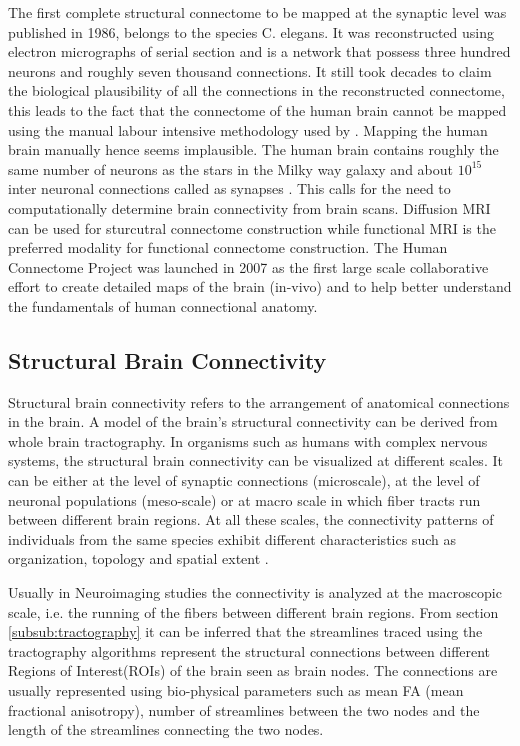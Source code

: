 \documentclass[msthesis.tex]{subfiles}
\begin{document}
The first complete structural connectome to be mapped at the synaptic level was published in 1986,  belongs to the species C. elegans. It was reconstructed using electron micrographs of serial section and is a network that possess three hundred neurons and roughly seven thousand connections. It still took decades to claim the biological plausibility of all the connections in the reconstructed connectome\cite{elegans}, this leads to the fact that the connectome of the human brain cannot be mapped using the manual labour intensive methodology used by \cite{white1986structure}. Mapping the human brain manually hence seems implausible. The human brain contains roughly the same number of neurons as the stars in the Milky way galaxy and about $10^{15}$ inter neuronal connections called as synapses \citep{fornito2015connectomics}. This calls for the need to computationally determine brain connectivity from brain scans. Diffusion MRI can be used for sturcutral connectome construction while functional MRI is the preferred modality for functional connectome construction. The Human Connectome Project was launched in 2007 as the first large scale collaborative effort to create detailed maps of the brain (in-vivo) and to help better understand the fundamentals of human connectional anatomy.

\subsection{Structural Brain Connectivity}
Structural brain connectivity refers to the arrangement of anatomical connections in the brain. A model of the brain's structural connectivity can be derived from whole brain tractography. In organisms such as humans with complex nervous systems, the structural brain connectivity can be visualized at different scales. It can be either at the level of synaptic connections (microscale), at the level of neuronal populations (meso-scale) or at macro scale in which fiber tracts run between different brain regions. At all these scales, the connectivity patterns of individuals from the same species exhibit different characteristics such as organization, topology and spatial extent \citep{Sporns:2007}.

Usually in Neuroimaging studies the connectivity is analyzed at the macroscopic scale, i.e. the running of the fibers between different brain regions.  From section \autoref{subsub:tractography} it can be inferred that the streamlines traced using the tractography algorithms represent the structural connections between different Regions of Interest(ROIs) of the brain seen as brain nodes. The connections are usually represented using bio-physical parameters such as mean FA (mean fractional anisotropy), number of streamlines between the two nodes and the length of the streamlines connecting the two nodes.
\end{document}
